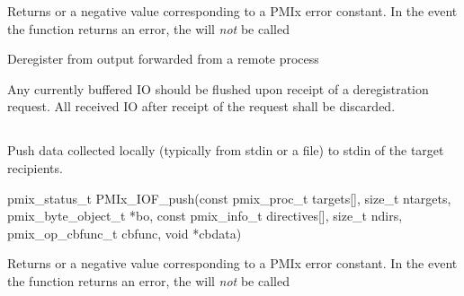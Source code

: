 Returns  or a negative value corresponding to a PMIx error constant. In the event the function returns an error, the  will \textit{not} be called

\descr

Deregister from output forwarded from a remote process

\adviceimplstart
Any currently buffered \ac{IO} should be flushed upon receipt of a deregistration request. All received \ac{IO} after receipt of the request shall be discarded.
\adviceimplend


\subsection{}

\summary

Push data collected locally (typically from stdin or a file) to stdin of the target recipients.

\format

\cspecificstart
\begin{codepar}
pmix_status_t
PMIx_IOF_push(const pmix_proc_t targets[], size_t ntargets,
              pmix_byte_object_t *bo,
              const pmix_info_t directives[], size_t ndirs,
              pmix_op_cbfunc_t cbfunc, void *cbdata)
\end{codepar}
\cspecificend

\begin{arglist}
\end{arglist}

Returns  or a negative value corresponding to a PMIx error constant. In the event the function returns an error, the  will \textit{not} be called

